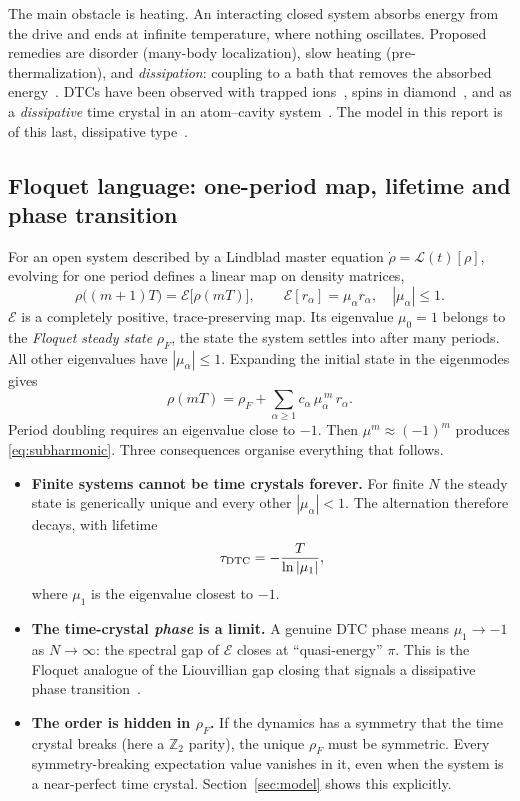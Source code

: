 \documentclass[11pt,a4paper]{article}
\newcommand{\Lio}{\mathcal{L}}
\newcommand{\E}{\mathcal{E}}
\begin{document}
The main obstacle is heating. An interacting closed system absorbs energy from the drive and
ends at infinite temperature, where nothing oscillates. Proposed remedies are disorder (many-body
localization), slow heating (pre-thermalization), and \emph{dissipation}: coupling to a bath that
removes the absorbed energy~\cite{khemani2016,else2016,sacha2018}. DTCs have been observed with
trapped ions~\cite{zhang2017}, spins in diamond~\cite{choi2017}, and as a \emph{dissipative} time
crystal in an atom--cavity system~\cite{kessler2021}. The model in this report is of this last,
dissipative type~\cite{gong2018}.

\subsection{Floquet language: one-period map, lifetime and phase transition}\label{sec:floquet}

For an open system described by a Lindblad master equation $\dot\rho=\Lio(t)[\rho]$, evolving
for one period defines a linear map on density matrices,
\begin{equation}
\rho\big((m+1)T\big)=\E\big[\rho(mT)\big],\qquad
\E[r_\alpha]=\mu_\alpha r_\alpha,\quad |\mu_\alpha|\le1 .
\end{equation}
$\E$ is a completely positive, trace-preserving map. Its eigenvalue $\mu_0=1$ belongs to the
\emph{Floquet steady state} $\rho_F$, the state the system settles into after many periods. All
other eigenvalues have $|\mu_\alpha|\le1$. Expanding the initial state in the eigenmodes gives
\begin{equation}
\rho(mT)=\rho_F+\sum_{\alpha\ge1}c_\alpha\,\mu_\alpha^{\,m}\,r_\alpha .
\label{eq:floquet_expansion}
\end{equation}
Period doubling requires an eigenvalue close to $-1$. Then $\mu^m\approx(-1)^m$ produces
\eqref{eq:subharmonic}. Three consequences organise everything that follows.
\begin{itemize}
\item \textbf{Finite systems cannot be time crystals forever.} For finite $N$ the steady state
  is generically unique and every other $|\mu_\alpha|<1$. The alternation therefore decays, with
  lifetime
  \begin{equation}
  \tau_{\rm DTC}=-\frac{T}{\ln|\mu_1|},
  \end{equation}
  where $\mu_1$ is the eigenvalue closest to $-1$.
\item \textbf{The time-crystal \emph{phase} is a limit.} A genuine DTC phase means
  $\mu_1\to-1$ as $N\to\infty$: the spectral gap of $\E$ closes at ``quasi-energy'' $\pi$. This
  is the Floquet analogue of the Liouvillian gap closing that signals a dissipative phase
  transition~\cite{minganti2018}.
\item \textbf{The order is hidden in $\rho_F$.} If the dynamics has a symmetry that the time
  crystal breaks (here a $\mathbb Z_2$ parity), the unique $\rho_F$ must be symmetric. Every
  symmetry-breaking expectation value vanishes in it, even when the system is a near-perfect
  time crystal. Section~\ref{sec:model} shows this explicitly.
\end{itemize}
\end{document}
